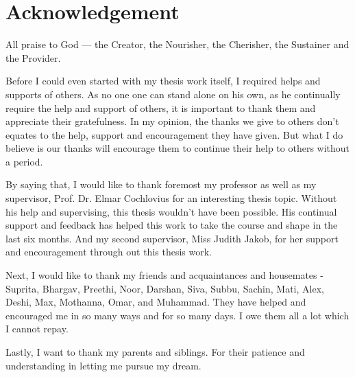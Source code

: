 \chapter*{Acknowledgement}

All praise to God --- the Creator, the Nourisher, the Cherisher, the Sustainer and the Provider.

Before I could even started with my thesis work itself, I required helps and supports of others. As no one one can stand alone on his own, as he continually require the help and support of others, it is important to thank them and appreciate their gratefulness. In my opinion, the thanks we give to others don't equates to the help, support and encouragement they have given. But what I do believe is our thanks will encourage them to continue their help to others without a period.

By saying that, I would like to thank foremost my professor as well as my supervisor, Prof. Dr. Elmar Cochlovius for an interesting thesis topic. Without his help and supervising, this thesis wouldn't have been possible. His continual support and feedback has helped this work to take the course and shape in the last six months. And my second supervisor, Miss Judith Jakob, for her support and encouragement through out this thesis work.

Next, I would like to thank my friends and acquaintances and housemates - Suprita, Bhargav, Preethi, Noor, Darshan, Siva, Subbu, Sachin, Mati, Alex, Deshi, Max, Mothanna, Omar, and Muhammad. They have helped and encouraged me in so many ways and for so many days. I owe them all a lot which I cannot repay. 

Lastly, I want to thank my parents and siblings. For their patience and understanding in letting me pursue my dream.
